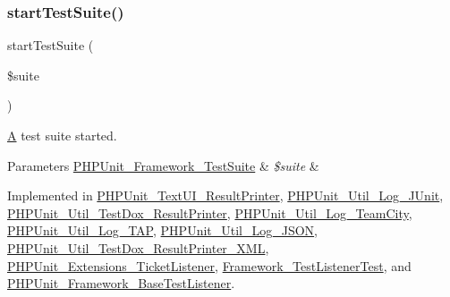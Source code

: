 \mbox{\label{interface_p_h_p_unit___framework___test_listener_a901a86a623d83184267b21f2daee0ff5}} 
\subsubsection{\texorpdfstring{start\+Test\+Suite()}{startTestSuite()}}
{\footnotesize\ttfamily start\+Test\+Suite (\begin{DoxyParamCaption}\item[{\mbox{\hyperlink{class_p_h_p_unit___framework___test_suite}{P\+H\+P\+Unit\+\_\+\+Framework\+\_\+\+Test\+Suite}}}]{\$suite }\end{DoxyParamCaption})}

\mbox{\hyperlink{class_a}{A}} test suite started.


\begin{DoxyParams}[1]{Parameters}
\mbox{\hyperlink{class_p_h_p_unit___framework___test_suite}{P\+H\+P\+Unit\+\_\+\+Framework\+\_\+\+Test\+Suite}} & {\em \$suite} & \\
\hline
\end{DoxyParams}


Implemented in \mbox{\hyperlink{class_p_h_p_unit___text_u_i___result_printer_a901a86a623d83184267b21f2daee0ff5}{P\+H\+P\+Unit\+\_\+\+Text\+U\+I\+\_\+\+Result\+Printer}}, \mbox{\hyperlink{class_p_h_p_unit___util___log___j_unit_a901a86a623d83184267b21f2daee0ff5}{P\+H\+P\+Unit\+\_\+\+Util\+\_\+\+Log\+\_\+\+J\+Unit}}, \mbox{\hyperlink{class_p_h_p_unit___util___test_dox___result_printer_a901a86a623d83184267b21f2daee0ff5}{P\+H\+P\+Unit\+\_\+\+Util\+\_\+\+Test\+Dox\+\_\+\+Result\+Printer}}, \mbox{\hyperlink{class_p_h_p_unit___util___log___team_city_a901a86a623d83184267b21f2daee0ff5}{P\+H\+P\+Unit\+\_\+\+Util\+\_\+\+Log\+\_\+\+Team\+City}}, \mbox{\hyperlink{class_p_h_p_unit___util___log___t_a_p_a901a86a623d83184267b21f2daee0ff5}{P\+H\+P\+Unit\+\_\+\+Util\+\_\+\+Log\+\_\+\+T\+AP}}, \mbox{\hyperlink{class_p_h_p_unit___util___log___j_s_o_n_a901a86a623d83184267b21f2daee0ff5}{P\+H\+P\+Unit\+\_\+\+Util\+\_\+\+Log\+\_\+\+J\+S\+ON}}, \mbox{\hyperlink{class_p_h_p_unit___util___test_dox___result_printer___x_m_l_a901a86a623d83184267b21f2daee0ff5}{P\+H\+P\+Unit\+\_\+\+Util\+\_\+\+Test\+Dox\+\_\+\+Result\+Printer\+\_\+\+X\+ML}}, \mbox{\hyperlink{class_p_h_p_unit___extensions___ticket_listener_a901a86a623d83184267b21f2daee0ff5}{P\+H\+P\+Unit\+\_\+\+Extensions\+\_\+\+Ticket\+Listener}}, \mbox{\hyperlink{class_framework___test_listener_test_a901a86a623d83184267b21f2daee0ff5}{Framework\+\_\+\+Test\+Listener\+Test}}, and \mbox{\hyperlink{class_p_h_p_unit___framework___base_test_listener_a901a86a623d83184267b21f2daee0ff5}{P\+H\+P\+Unit\+\_\+\+Framework\+\_\+\+Base\+Test\+Listener}}.




